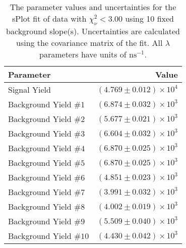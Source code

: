 
\begin{table}
    \begin{center}
        \begin{tabular}{lr}\toprule
            Parameter & Value \\\midrule
            Signal Yield & $(4.769 \pm 0.012) \times 10^{4}$ \\
            Background Yield $\#1$ & $(6.874 \pm 0.032) \times 10^{3}$ \\
            Background Yield $\#2$ & $(5.677 \pm 0.021) \times 10^{3}$ \\
            Background Yield $\#3$ & $(6.604 \pm 0.032) \times 10^{3}$ \\
            Background Yield $\#4$ & $(6.870 \pm 0.025) \times 10^{3}$ \\
            Background Yield $\#5$ & $(6.870 \pm 0.025) \times 10^{3}$ \\
            Background Yield $\#6$ & $(4.851 \pm 0.023) \times 10^{3}$ \\
            Background Yield $\#7$ & $(3.991 \pm 0.032) \times 10^{3}$ \\
            Background Yield $\#8$ & $(4.002 \pm 0.019) \times 10^{3}$ \\
            Background Yield $\#9$ & $(5.509 \pm 0.040) \times 10^{3}$ \\
            Background Yield $\#10$ & $(4.430 \pm 0.042) \times 10^{3}$ \\\bottomrule
        \end{tabular}
        \caption{The parameter values and uncertainties for the sPlot fit of data with $\chi^2_\nu < 3.00$ using 10 fixed background slope(s). Uncertainties are calculated using the covariance matrix of the fit. All $\lambda$ parameters have units of $\si{\nano\second}^{-1}$.}
    \end{center}
\end{table}
